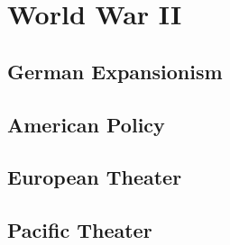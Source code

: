 \chapter{World War II}

\section{German Expansionism}

\section{American Policy}

\section{European Theater}

\section{Pacific Theater}

